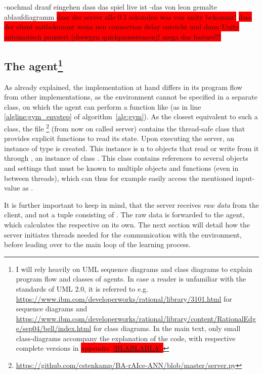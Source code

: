 -nochmal drauf eingehen dass das spiel live ist
-das von leon gemalte ablaufdiagramm
\colorbox{red}{dass der server alle 0.1 sekunden was von unity bekommt!}
\colorbox{red}{dass der client mitbekommt wenn nen connection delay entsteht und dann 
	Unity automatisch pausiert (deswgen quickpausereason)! mega das feature!!!}


\subsection{The agent\footnote{I will rely heavily on UML sequence diagrams and class diagrams to explain program flow and classes of agents. In case a reader is unfamiliar with the standards of UML 2.0, it is referred to e.g. \url{https://www.ibm.com/developerworks/rational/library/3101.html} for sequence diagrams and \url{https://www.ibm.com/developerworks/rational/library/content/RationalEdge/sep04/bell/index.html} for class diagrams. In the main text, only small class-diagrams accompany the explanation of the code, with respective complete versions in  \colorbox{red}{appendix~\ref{BLABLABLA}.}}}

As already explained, the implementation at hand differs in its program flow from other implementations, as the environment cannot be specified in a separate class, on which the agent can perform a function like  (as in line \ref{algline:gym_envstep} of algorithm~\ref{alg:gym}). As the closest equivalent to such a class, the file  \footnote{\url{https://github.com/cstenkamp/BA-rAIce-ANN/blob/master/server.py}} (from now on called server) contains the thread-safe class  that provides explicit functions to read its state. Upon executing the server, an instance  of type  is created. This instance is n to objects that read or write from it through , an instance of class . This class contains references to several objects and settings that must be known to multiple objects and functions (even in between threads), which can thus for example easily access the mentioned input-value as .

It is further important to keep in mind, that the server receives \textit{raw data} from the client, and not a tuple consisting of . The raw data is forwarded to the agent, which calculates the respective  on its own. The next section will detail how the server initiates threads needed for the communication with the environment, before leading over to the main loop of the learning process.


